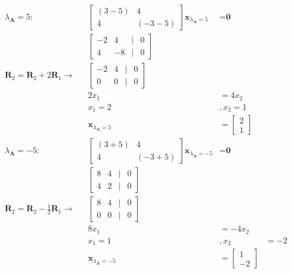 \documentclass{article}
\begin{document}
\begin{align}
    \label{eq:16}
    \lambda_\textbf{A} = 5: && \begin{bmatrix}
    (3-5) & 4\\4&(-3-5)
    \end{bmatrix} \textbf{x}_{\lambda_\textbf{A} = 5} &= \textbf{0}
    \\
    \label{eq:17}
    &&\begin{bmatrix}
    -2 & 4 &|& 0\\
    4&-8 &|& 0
    \end{bmatrix}
    \\
    \label{eq:18}
    \textbf{R}_2 = \textbf{R}_2 +2\textbf{R}_1 \rightarrow && \begin{bmatrix}
    -2 & 4 &|& 0\\
    0 & 0 &|& 0
    \end{bmatrix}
    \\
    \label{eq:19}
    && 2x_1 &= 4x_2
    \\
    \label{eq:20}
    && x_1 = 2 &, x_2 = 1
    \\
    \label{eq:21}
    && \textbf{x}_{\lambda_\textbf{A}=5} &= \begin{bmatrix}
    2\\1
    \end{bmatrix}
    \\
    \label{eq:22}
    \lambda_\textbf{A} = -5: && 
    \begin{bmatrix}
    (3+5) & 4\\
    4 & (-3+5)\end{bmatrix} \textbf{x}_{\lambda_\textbf{A}=-5} &= \textbf{0}
    \\
    \label{eq:23} 
    && \begin{bmatrix}
    8 & 4 &|& 0\\
    4 & 2 &|& 0
    \end{bmatrix}
    \\
    \label{eq:24}
    \textbf{R}_2 = \textbf{R}_2 -\frac{1}{2}\textbf{R}_1 \rightarrow && \begin{bmatrix}
    8 & 4 &|& 0\\
    0&0&|& 0
    \end{bmatrix}
    \\
    \label{eq:25}
    && 8x_1&=-4x_2
    \\
    \label{eq:26}
    && x_1=1 &, x_2 &= -2
    \\
    \label{eq:27}
    && \textbf{x}_{\lambda_\textbf{A} = -5} &= \begin{bmatrix}
    1\\-2
    \end{bmatrix}
\end{align}
\end{document}
